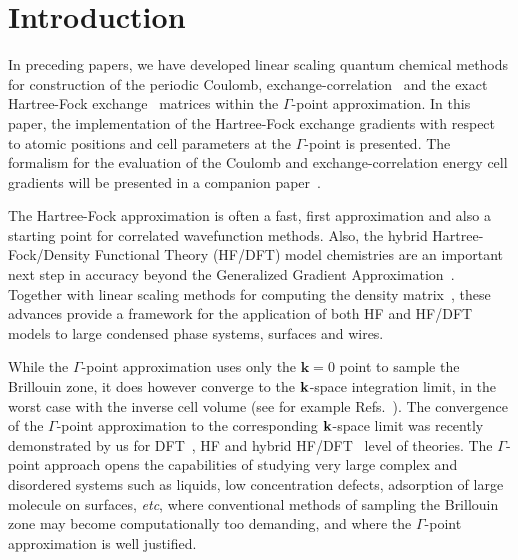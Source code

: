 \documentclass[prl,preprint,doublespace]{revtex4} %
\begin{document}


\section{Introduction}
In preceding papers, we have developed linear scaling quantum chemical methods
for construction of the periodic Coulomb, exchange-correlation~\cite{CTymczak04a}
and the exact Hartree-Fock exchange~\cite{CTymczak04b} 
matrices within the $\Gamma$-point approximation. 
In this paper, the implementation of the Hartree-Fock exchange
gradients with respect to atomic positions and cell parameters
at the $\Gamma$-point is presented. 
The formalism for the evaluation of the Coulomb and 
exchange-correlation energy cell gradients will be presented 
in a companion paper~\cite{CTymczak05}.

The Hartree-Fock approximation is often a fast, first approximation and 
also a starting point for correlated wavefunction methods.
Also, the hybrid Hartree-Fock/Density Functional Theory (HF/DFT) model chemistries
are an important next step in accuracy beyond the Generalized Gradient 
Approximation~\cite{Gill92,Becke93,VBarone96,CAdamo99}. Together with linear
scaling methods for computing the density matrix~\cite{ANiklasson02A,ANiklasson03}, these
advances provide a framework for the application of both HF and HF/DFT 
models to large condensed phase systems, surfaces and wires.

While the $\Gamma$-point approximation uses only the $\mathbf{k}=0$ point to sample
the Brillouin zone, it does however converge to the 
${\bf k}$-space integration limit, in the worst case with the inverse  
cell volume (see for example Refs.~\cite{CKittel71,NAshcroft76}).
The convergence of the $\Gamma$-point approximation to 
the corresponding ${\bf k}$-space limit was recently 
demonstrated by us for DFT~\cite{CTymczak04a}, HF and hybrid 
HF/DFT~\cite{CTymczak04b} level of theories.
The $\Gamma$-point approach opens the capabilities of studying very large 
complex and disordered systems such as liquids, low concentration defects, adsorption of 
large molecule on surfaces, {\em etc}, where conventional methods 
of sampling the Brillouin zone may become computationally too demanding, and
where the $\Gamma$-point approximation is well justified.
\end{document}
